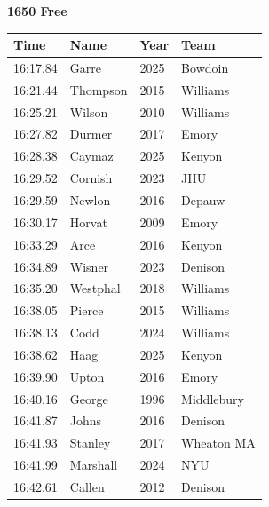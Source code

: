 \noindent\begin{minipage}[t]{0.98\textwidth}
\centering
\textbf{\textcolor{teamprimary}{1650 Free}}\par
\vspace{0.5em}
\centering
\small
\renewcommand{\arraystretch}{1.0}
\setlength{\tabcolsep}{4pt}
\begin{tabular}{@{}p{2.5cm}p{4.5cm}p{1.5cm}p{2.5cm}@{}}
\toprule
\textbf{Time} & \textbf{Name} & \textbf{Year} & \textbf{Team} \\
\midrule
16:17.84 & Garre & 2025 & Bowdoin \\
16:21.44 & Thompson & 2015 & Williams \\
16:25.21 & Wilson & 2010 & Williams \\
16:27.82 & Durmer & 2017 & Emory \\
16:28.38 & Caymaz & 2025 & Kenyon \\
16:29.52 & Cornish & 2023 & JHU \\
16:29.59 & Newlon & 2016 & Depauw \\
16:30.17 & Horvat & 2009 & Emory \\
16:33.29 & Arce & 2016 & Kenyon \\
16:34.89 & Wisner & 2023 & Denison \\
16:35.20 & Westphal & 2018 & Williams \\
16:38.05 & Pierce & 2015 & Williams \\
16:38.13 & Codd & 2024 & Williams \\
16:38.62 & Haag & 2025 & Kenyon \\
16:39.90 & Upton & 2016 & Emory \\
16:40.16 & George & 1996 & Middlebury \\
16:41.87 & Johns & 2016 & Denison \\
16:41.93 & Stanley & 2017 & Wheaton MA \\
16:41.99 & Marshall & 2024 & NYU \\
16:42.61 & Callen & 2012 & Denison \\
\bottomrule
\end{tabular}
\end{minipage}
\vspace{1.2em}
